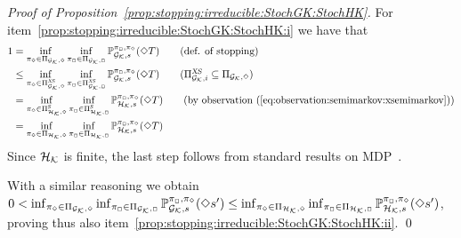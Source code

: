 \begin{proof}[Proof of Proposition~\ref{prop:stopping:irreducible:StochGK:StochHK}]
  For item~\ref{prop:stopping:irreducible:StochGK:StochHK:i} we have that
  \begin{align*}
    1
    & =
    \inf_{\strat_\minplay\in\Strategies{\StochGK,\minplay}}\inf_{\strat_\maxplay\in\Strategies{\StochGK,\maxplay}}\Prob^{\strat_{\maxplay},\strat_{\minplay}}_{\StochGK,s}(\Finally T)
    \tag{def. of stopping}\\
    & \leq
    \inf_{\strat_\minplay\in\XSemiMarkovStrats{\StochGK,\minplay}}\inf_{\strat_\maxplay\in\XSemiMarkovStrats{\StochGK,\maxplay}}\Prob^{\strat_{\maxplay},\strat_{\minplay}}_{\StochGK,s}(\Finally T)
    \tag{$\XSemiMarkovStrats{\StochGK,i}\subseteq\Strategies{\StochGK,\minplay}$}\\
    & =
    \inf_{\strat_\minplay\in\SemiMarkovStrats{\StochHK,\minplay}}\inf_{\strat_\maxplay\in\SemiMarkovStrats{\StochHK,\maxplay}}\Prob^{\strat_{\maxplay},\strat_{\minplay}}_{\StochHK,s}(\Finally T)
    \tag{by observation~(\ref{eq:observation:semimarkov:xsemimarkov})}\\
    & =
    \inf_{\strat_\minplay\in\Strategies{\StochHK,\minplay}}\inf_{\strat_\maxplay\in\Strategies{\StochHK,\maxplay}}\Prob^{\strat_{\maxplay},\strat_{\minplay}}_{\StochHK,s}(\Finally T)
  \end{align*}
  Since ${\mathcal{H}_{\mathcal{K}}}$ is finite, the last step follows from standard
  results on MDP~\cite{Puterman94}.
  
  With a similar reasoning we obtain
  $0 <
  \inf_{\pi_{\Diamond}\in\Pi_{{\mathcal{G}_{\mathcal{K}}},{\Diamond}}}\inf_{\pi_{\Box}\in\Pi_{{\mathcal{G}_{\mathcal{K}}},{\Box}}}\mathbb{P}^{\pi_{{\Box}},\pi_{{\Diamond}}}_{{\mathcal{G}_{\mathcal{K}}},s}(\Diamond s')
  \leq
  \inf_{\pi_{\Diamond}\in\Pi_{{\mathcal{H}_{\mathcal{K}}},{\Diamond}}}\inf_{\pi_{\Box}\in\Pi_{{\mathcal{H}_{\mathcal{K}}},{\Box}}}\mathbb{P}^{\pi_{{\Box}},\pi_{{\Diamond}}}_{{\mathcal{H}_{\mathcal{K}}},s}(\Diamond s')$,
  proving thus also item~\ref{prop:stopping:irreducible:StochGK:StochHK:ii}.
  \qed
\end{proof}




